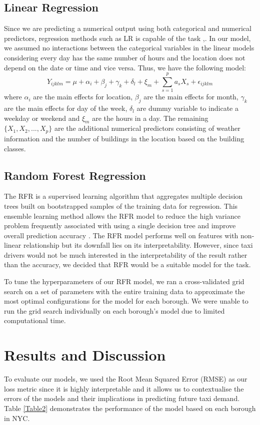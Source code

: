 \documentclass[11pt]{article}
\begin{document}
\subsection{Linear Regression}
Since we are predicting a numerical output using both categorical and numerical predictors, regression methods such as LR is capable of the task \cite{linearregression},\cite{linearstatsmodel}. In our model, we assumed no interactions between the categorical variables in the linear models considering every day has the same number of hours and the location does not depend on the date or time and vice versa. Thus, we have the following model:
$$Y_{ijklm}=\mu+\alpha_i+\beta_j+\gamma_k+\delta_l+\xi_m+\sum_{s=1}^{p}a_sX_s+\epsilon_{ijklm}$$
where $\alpha_i$ are the main effects for location, $\beta_j$ are the main effects for month, $\gamma_k$ are the main effects for day of the week, $\delta_l$ are dummy variable to indicate a weekday or weekend and $\xi_m$ are the hours in a day. The remaining $\{X_1,X_2,...,X_p\}$ are the additional numerical predictors consisting of weather information and the number of buildings in the location based on the building classes.

\subsection{Random Forest Regression}
The RFR is a supervised learning algorithm that aggregates multiple decision trees built on bootstrapped samples of the training data for regression. This ensemble learning method allows the RFR model to reduce the high variance problem frequently associated with using a single decision tree and improve overall prediction accuracy \cite{randomforest}. The RFR model performs well on features with non-linear relationship but its downfall lies on its interpretability. However, since taxi drivers would not be much interested in the interpretability of the result rather than the accuracy, we decided that RFR would be a suitable model for the task.

To tune the hyperparameters of our RFR model, we ran a cross-validated grid search on a set of parameters with the entire training data to approximate the most optimal configurations for the model for each borough. We were unable to run the grid search individually on each borough's model due to limited computational time.

\section{Results and Discussion}
To evaluate our models, we used the Root Mean Squared Error (RMSE) as our loss metric since it is highly interpretable and it allows us to contextualise the errors of the models and their implications in predicting future taxi demand. Table \ref{Table2} demonstrates the performance of the model based on each borough in NYC.
\end{document}
